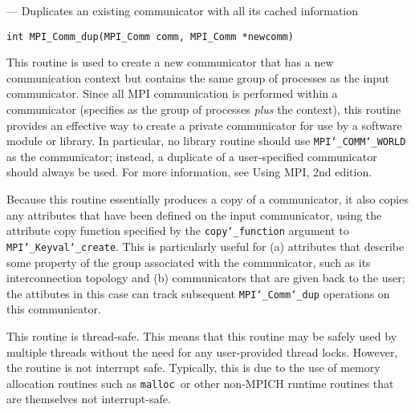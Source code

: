 \startmanpage
{}
--- Duplicates an existing communicator with all its cached information 
\startvb\begin{verbatim}
int MPI_Comm_dup(MPI_Comm comm, MPI_Comm *newcomm)

\end{verbatim}
\endvb

\par
{}
\par
{}
This routine is used to create a new communicator that has a new
communication context but contains the same group of processes as
the input communicator.  Since all MPI communication is performed
within a communicator (specifies as the group of processes {\em plus
}the context), this routine provides an effective way to create a
private communicator for use by a software module or library.  In
particular, no library routine should use {\tt MPI{\tt \char`\_}COMM{\tt \char`\_}WORLD} as the
communicator; instead, a duplicate of a user-specified communicator
should always be used.  For more information, see Using MPI, 2nd
edition.
\par
Because this routine essentially produces a copy of a communicator,
it also copies any attributes that have been defined on the input
communicator, using the attribute copy function specified by the
{\tt copy{\tt \char`\_}function} argument to {\tt MPI{\tt \char`\_}Keyval{\tt \char`\_}create}.  This is
particularly useful for (a) attributes that describe some property
of the group associated with the communicator, such as its
interconnection topology and (b) communicators that are given back
to the user; the attibutes in this case can track subsequent
{\tt MPI{\tt \char`\_}Comm{\tt \char`\_}dup} operations on this communicator.
\par
{}
\par
This routine is thread-safe.  This means that this routine may be
safely used by multiple threads without the need for any user-provided
thread locks.  However, the routine is not interrupt safe.  Typically,
this is due to the use of memory allocation routines such as {\tt malloc
}or other non-MPICH runtime routines that are themselves not interrupt-safe.
